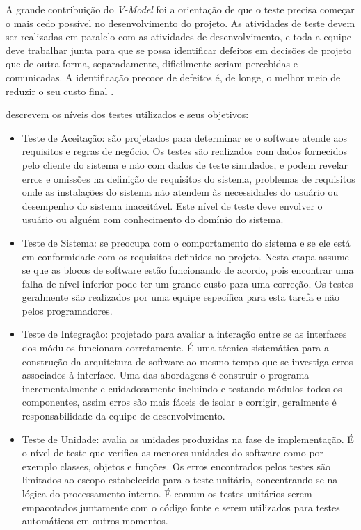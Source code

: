 A grande contribuição do \textit{V-Model} foi a orientação de que o teste precisa começar o mais cedo possível no desenvolvimento do projeto. As atividades de teste devem ser realizadas em paralelo com as atividades de desenvolvimento, e toda a equipe deve trabalhar junta para que se possa identificar defeitos em decisões de projeto que de outra forma, separadamente, dificilmente seriam percebidas e comunicadas. A identificação precoce de defeitos é, de longe, o melhor meio de reduzir o seu custo final \cite{ammann2016introduction}.

\cite{graham2008foundations,ammann2016introduction} descrevem os níveis dos testes utilizados e seus objetivos:

\begin{itemize}
\item Teste de Aceitação: são projetados para determinar se o software atende aos requisitos e regras de negócio. Os testes são realizados com dados fornecidos pelo cliente do sistema e não com dados de teste simulados, e podem revelar erros e omissões na definição de requisitos do sistema, problemas de requisitos onde as instalações do sistema não atendem às necessidades do usuário ou desempenho do sistema inaceitável. Este nível de teste deve envolver o usuário ou alguém com conhecimento do domínio do sistema. 
\item Teste de Sistema: se preocupa com o comportamento do sistema e se ele está em conformidade com os requisitos definidos no projeto. Nesta etapa assume-se que as blocos de software estão funcionando de acordo, pois encontrar uma falha de nível inferior pode ter um grande custo para uma correção. Os testes geralmente são realizados por uma equipe específica para esta tarefa e não pelos programadores.
\item Teste de Integração: projetado para avaliar a interação entre se as interfaces dos módulos funcionam corretamente. É uma técnica sistemática para a construção da arquitetura de software ao mesmo tempo que se investiga erros associados à interface. Uma das abordagens é construir o programa incrementalmente e cuidadosamente incluindo e testando módulos todos os componentes, assim erros são mais fáceis de isolar e corrigir, geralmente é responsabilidade da equipe de desenvolvimento.
\item Teste de Unidade: avalia as unidades produzidas na fase de implementação. É o nível de teste que verifica as menores unidades do software como por exemplo classes, objetos e funções. Os erros encontrados pelos testes são limitados ao escopo estabelecido para o teste unitário,  concentrando-se na lógica do processamento interno.  É comum os testes unitários serem empacotados juntamente com o código fonte e serem utilizados para testes automáticos em outros momentos.
\end{itemize}


